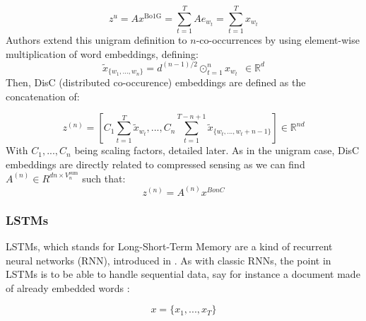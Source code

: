 \documentclass{article}
\newcommand{\R}{\mathbb R}
\begin{document}
\[z^u = Ax^{\text{Bo1G}} = \sum_{t=1}^T A e_{w_t} = \sum_{t=1}^T x_{w_t} \]
Authors extend this unigram definition to $n$-co-occurrences by using
element-wise multiplication of word embeddings, defining: 
\[\tilde{x}_{\{w_1, ..., w_n\}} = d^{(n-1)/2} \odot_{t=1}^n x_{w_t} \ \ \in \R^d \]
Then, DisC (distributed co-occurence) embeddings are defined as
the concatenation of:

\[
    z^{(n)} = \left [ 
                C_1 \sum_{t=1}^T \tilde{x}_{w_t}, 
                ..., 
                C_n \sum_{t=1}^{T-n+1} \tilde{x}_{\{w_t, ..., w_t+n-1\}}
              \right ]
              \in \R^{nd}
\]
With $C_1,..., C_n$ being scaling factors, detailed later. As in the 
unigram case, DisC embeddings are directly related to compressed sensing
as we can find $A^{(n)}\in R^{dn \times V_n^{\text{sum}}}$ such that:
\[z^{(n)} = A^{(n)}x^{BonC} \]

\subsubsection{LSTMs}

LSTMs, which stands for Long-Short-Term Memory are a kind of recurrent
neural networks (RNN), introduced in \cite{Hochreiter:1997:LSM:1246443.1246450}.
As with classic RNNs, the point in LSTMs is to be able to 
handle sequential data, say for instance a document made of already 
embedded words :

\[   x =\{x_1, ..., x_T \} \]
\end{document}
